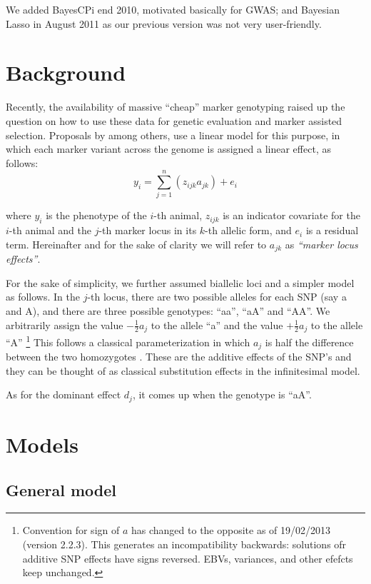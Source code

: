 \documentclass[a4paper,12pt,titlepage]{article}      %
\begin{document}
We added BayesCPi end 2010, motivated basically for GWAS; and Bayesian Lasso in August 2011 as our previous version was not very user-friendly.

\section{Background}
Recently, the availability of massive ``cheap'' marker genotyping raised up the question on how to use these data for genetic evaluation and marker assisted selection. Proposals by \cite{Lande1990, Meuwissen2001a} among others, use a linear model for this purpose, in which each marker variant across the genome is assigned a linear effect, as follows:
$$ y_i = \sum_{j=1}^{n} \left( z_{ijk} a_{jk}  \right) + e_i $$
  
where $y_i$ is the phenotype of the $i$-th animal, $z_{ijk}$ is an indicator covariate for the $i$-th animal and the $j$-th marker locus in its $k$-th allelic form, and $e_i$ is a residual term. 
Hereinafter and for the sake of clarity we will refer to $a_{jk}$ as \emph{``marker locus effects''}. 

For the sake of simplicity, we further assumed biallelic loci and a simpler model as follows.
In the $j$-th locus, there are two possible alleles for each SNP (say a and A), and there are three possible genotypes: ``aa'', ``aA'' and ``AA''. We arbitrarily assign the value $ - \frac{1}{2}a_j$  to the allele ``a'' and the value $ + \frac{1}{2}a_j$ to the allele ``A'' \footnote{Convention for sign of $a$ has changed to the opposite as of 19/02/2013 (version 2.2.3). This generates an incompatibility backwards: solutions ofr additive SNP effects have signs reversed. EBVs, variances, and other efefcts keep unchanged.} This follows a classical parameterization in which $a_j$ is half the difference between the two homozygotes \cite{Lynch1998}. These are the additive effects of the SNP's and they can be thought of as classical substitution effects in the infinitesimal model. 

As for the dominant effect $d_j$, it comes up when the genotype is ``aA''.


\section{Models}


\subsection{General model}
\end{document}
